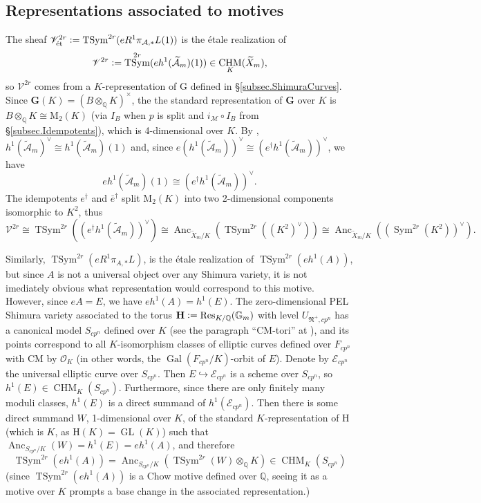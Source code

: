 \documentclass[a4paper]{amsart}
\numberwithin{equation}{section}
\theoremstyle{definition}
\newcommand{\Q}{\mathbb{Q}}
\newcommand{\G}{\mathbb{G}}
\newcommand{\defeq}{\vcentcolon=}
\DeclareMathOperator{\Gal}{Gal}
\DeclareMathOperator{\GL}{GL}
\DeclareMathOperator{\et}{\text{\'et}}
\DeclareMathOperator{\TSym}{TSym}
\DeclareMathOperator{\Sym}{Sym}
\DeclareMathOperator{\Res}{Res}
\DeclareMathOperator{\CHM}{CHM}
\DeclareMathOperator{\Anc}{Anc}
\newcommand{\boldG}{\boldsymbol{\mathrm{G}}}
\newcommand{\boldH}{\boldsymbol{\mathrm{H}}}
\renewcommand{\et}{\mathrm{\acute{e}t}}
\begin{document}
\subsection{Representations associated to motives}\label{subsec.RepresentationsAssociatedToMotives}
The sheaf $\mathscr{V}^{2r}_{\et}\defeq\TSym^{2r}(eR^1\pi_{\mathcal{A},*}L(1))$ is the étale realization of
\begin{equation}\label{eq.MotiveV}
\mathscr{V}^{2r}\defeq\TSym^{2r}(eh^1(\widetilde{\mathcal{A}}_m)(1))\in\CHM_{K}(\widetilde{X}_m),
\end{equation}
so $\mathscr{V}^{2r}$ comes from a $K$-representation of $\boldG$ defined in \S\ref{subsec.ShimuraCurves}. Since $\mathbf{G}(K)=(B\otimes_\Q K)^\times$, the the standard representation of $\mathbf{G}$ over $K$ is $B\otimes_\Q K\cong\mathrm{M}_2(K)$ (via $I_B$ when $p$ is split and $i_\mathcal{M}\circ I_B$ from \S\ref{subsec.Idempotents}), which is 4-dimensional over $K$.
By \cite[Corollaire 2.6]{Ancona}, $h^1(\widetilde{\mathcal{A}}_m)^\vee\cong h^1(\widetilde{\mathcal{A}}_m)(1)$ and, since $e(h^1(\widetilde{\mathcal{A}}_m))^\vee\cong (e^\dagger h^1(\widetilde{\mathcal{A}}_m))^\vee$, we have \[eh^1(\widetilde{\mathcal{A}}_m)(1)\cong (e^\dagger h^1(\widetilde{\mathcal{A}}_m))^\vee.\] 
The idempotents $e^\dagger$ and $\bar e^\dagger$ split $\mathrm{M}_2(K)$ into two 2-dimensional components isomorphic to $K^2$, thus \[\mathscr{V}^{2r}\cong\TSym^{2r}\left((e^\dagger h^1(\widetilde{\mathcal{A}}_m))^\vee\right)\cong\Anc_{\widetilde{X}_m/K}\left(\TSym^{2r}((K^2)^\vee)\right)\cong\Anc_{\widetilde{X}_m/K}\left((\Sym^{2r}(K^2))^\vee\right).\]

Similarly, $\TSym^{2r}(eR^1\pi_{A,*}L)$, is the étale realization of $\TSym^{2r}(eh^1(A))$, but since $A$ is not a universal object over any Shimura variety, it is not imediately obvious what representation would correspond to this motive. However, since $eA=E$, we have $eh^1(A)=h^1(E)$. The zero-dimensional PEL Shimura variety associated to the torus $\boldH\defeq\Res_{K/\Q}(\G_m)$ with level $U_{\mathfrak{N}^+,cp^n}$ has a canonical model $S_{cp^n}$ defined over $K$ (see the paragraph ``CM-tori'' at \cite[p. 347]{Milne.SV}), and its points correspond to all $K$-isomorphism classes of elliptic curves defined over $F_{cp^n}$ with CM by $\mathcal{O}_K$ (in other words, the $\Gal(F_{cp^n}/K)$-orbit of $E$). Denote by $\mathcal{E}_{cp^n}$ the universal elliptic curve over $S_{cp^n}$. Then $E\hookrightarrow\mathcal{E}_{cp^n}$ is a scheme over $S_{cp^n}$, so $h^1(E)\in\CHM_K(S_{cp^n})$. Furthermore, since there are only finitely many moduli classes, $h^1(E)$ is a direct summand of $h^1(\mathcal{E}_{cp^n})$. Then there is some direct summand $W$, 1-dimensional over $K$, of the standard $K$-representation of $\boldH$ (which is $K$, as $\boldH(K)=\GL(K)$) such that $\Anc_{S_{cp^n}/K}(W)=h^1(E)=eh^1(A)$, and therefore \[\TSym^{2r}(eh^1(A))=\Anc_{S_{cp^n}/K}\left(\TSym^{2r}(W)\otimes_{\Q}K\right)\in\CHM_{K}(S_{cp^n})\](since $\TSym^{2r}(eh^1(A))$ is a Chow motive defined over $\Q$, seeing it as a motive over $K$ prompts a base change in the associated representation.)
\end{document}
